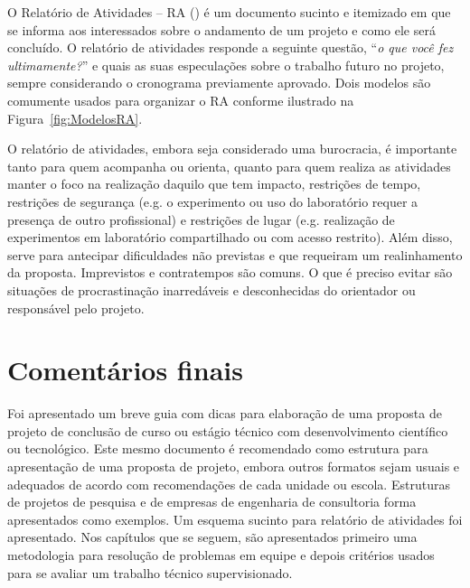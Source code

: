 O Relatório de Atividades -- RA (\cite{Markel1994}) é um documento sucinto e itemizado em que se informa aos interessados sobre o andamento de um projeto e como ele será concluído. O relatório de atividades responde a seguinte questão, ``\emph{o que você fez ultimamente?}'' e quais as suas especulações sobre o trabalho futuro no projeto, sempre considerando o cronograma previamente aprovado.
Dois modelos são comumente usados para organizar o RA conforme ilustrado na Figura~\ref{fig:ModelosRA}.
%

O relatório de atividades, embora seja considerado uma burocracia, é importante tanto para quem acompanha ou orienta, quanto para quem realiza as atividades manter o foco na realização daquilo que tem impacto, restrições de tempo, restrições de segurança (e.g. o experimento ou uso do laboratório requer a presença de outro profissional) e restrições de lugar (e.g. realização de experimentos em laboratório compartilhado ou com acesso restrito). Além disso, serve para antecipar dificuldades não previstas e que requeiram um realinhamento da proposta. Imprevistos e contratempos são comuns. O que é preciso evitar são situações de procrastinação inarredáveis e desconhecidas do orientador ou responsável pelo projeto. 


\section{Comentários finais}

Foi apresentado um breve guia com dicas para elaboração de uma proposta de projeto de conclusão de curso ou estágio técnico com desenvolvimento científico ou tecnológico. Este mesmo documento é recomendado como estrutura para apresentação de uma proposta de projeto, embora outros formatos sejam usuais e adequados de acordo com recomendações de cada unidade ou escola. Estruturas de projetos de pesquisa e de empresas de engenharia de consultoria forma apresentados como exemplos. Um esquema sucinto para relatório de atividades foi apresentado. Nos capítulos que se seguem, são apresentados primeiro uma metodologia para resolução de problemas em equipe e depois critérios usados para se avaliar um trabalho técnico supervisionado.
